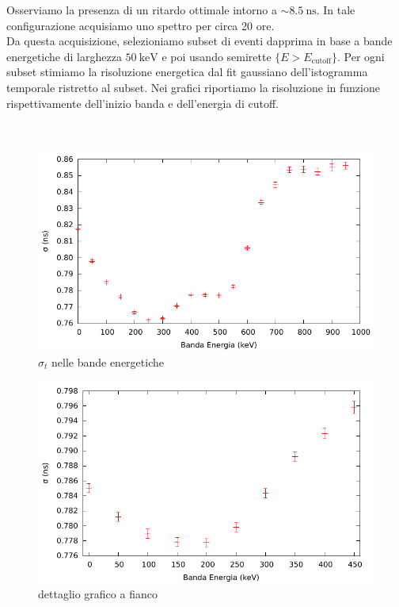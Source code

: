 \documentclass[a4paper,11pt,italian]{report}
\begin{document}
Osserviamo la presenza di un ritardo ottimale intorno a $\sim \SI{8.5}{\nano\second}$. In tale configurazione acquisiamo uno spettro per circa 20 ore.\\

Da questa acquisizione, selezioniamo subset di eventi dapprima in base a bande energetiche di larghezza $\SI{50}{\kilo\electronvolt}$ e poi usando semirette $\{ E > E_{\text{cutoff}} \}$. Per ogni subset stimiamo la risoluzione energetica dal fit gaussiano dell'istogramma temporale ristretto al subset. Nei grafici riportiamo la risoluzione in funzione rispettivamente dell'inizio banda e dell'energia di cutoff.

~\\
\begin{minipage}{0.45\linewidth}
	\centering
	\begin{figure}[H]
	\includegraphics[width=\columnwidth,keepaspectratio]{../out/Banda}
	\caption{\small{$\sigma_t$ nelle bande energetiche}}
	\end{figure}
\end{minipage}
\begin{minipage}{0.45\linewidth}
	\begin{figure}[H]
	\includegraphics[width=\columnwidth,keepaspectratio]{../out/Banda2}
	\caption{\small{dettaglio grafico a fianco}}
	\end{figure}
\end{minipage}
\end{document}
